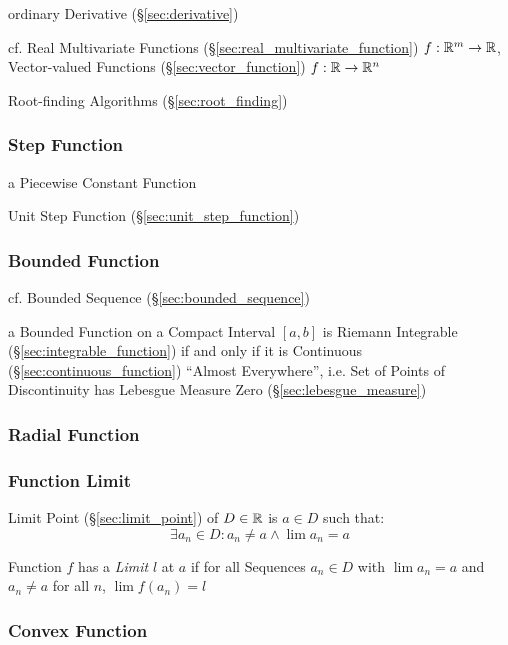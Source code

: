 ordinary Derivative (\S\ref{sec:derivative})

\fist cf. Real Multivariate Functions (\S\ref{sec:real_multivariate_function})
$f : \mathbb{R}^m \rightarrow \mathbb{R}$,
Vector-valued Functions (\S\ref{sec:vector_function}) $f : \mathbb{R} \rightarrow
\mathbb{R}^n$

\fist Root-finding Algorithms (\S\ref{sec:root_finding})



\subsubsection{Step Function}\label{sec:step_function}

a Piecewise Constant Function

Unit Step Function (\S\ref{sec:unit_step_function})



\subsubsection{Bounded Function}\label{sec:bounded_function}

\fist cf. Bounded Sequence (\S\ref{sec:bounded_sequence})

a Bounded Function on a Compact Interval $[a,b]$ is Riemann Integrable
(\S\ref{sec:integrable_function}) if and only if it is Continuous
(\S\ref{sec:continuous_function}) ``Almost Everywhere'', i.e. Set of Points of
Discontinuity has Lebesgue Measure Zero (\S\ref{sec:lebesgue_measure})



\subsubsection{Radial Function}\label{sec:radial_function}

\subsubsection{Function Limit}\label{sec:function_limit}

Limit Point (\S\ref{sec:limit_point}) of $D \in \mathbb{R}$ is $a \in D$
such that:
\[
  \exists a_n \in D : a_n \neq a \wedge \lim a_n = a
\]

Function $f$ has a \emph{Limit} $l$ at $a$ if for all Sequences $a_n
\in D$ with $\lim a_n = a$ and $a_n \neq a$ for all $n$, $\lim f(a_n)
= l$



\subsubsection{Convex Function}\label{sec:convex_function}


